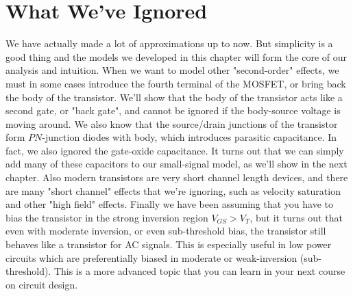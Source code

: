 \section{What We've Ignored}
We have actually made a lot of approximations up to now.  But simplicity is a good thing and the models we developed in this chapter will form the core of our analysis and intuition.  When we want to model other "second-order" effects, we must in some cases introduce the fourth terminal of the MOSFET, or bring back the body of the transistor.  We'll show that the body of the transistor acts like a second gate, or "back gate", and cannot be ignored if the body-source voltage is moving around.  We also know that the source/drain junctions of the transistor form $PN$-junction diodes with body, which  introduces parasitic capacitance.  In fact, we also ignored the gate-oxide capacitance. It turns out that we can simply add many of these capacitors to our small-signal model, as we'll show in the next chapter.
Also modern transistors are very short channel length devices, and there are many "short channel" effects that we're ignoring, such as velocity saturation and other "high field" effects.  Finally we have been assuming that you have to bias the transistor in the strong inversion region $V_{GS} > V_T$, but it turns out that even with moderate inversion, or even sub-threshold bias, the transistor still behaves like a transistor for AC signals.  This is especially useful in low power circuits which are preferentially biased in moderate or weak-inversion (sub-threshold).  This is a more advanced topic that you can learn in your next course on circuit design.
